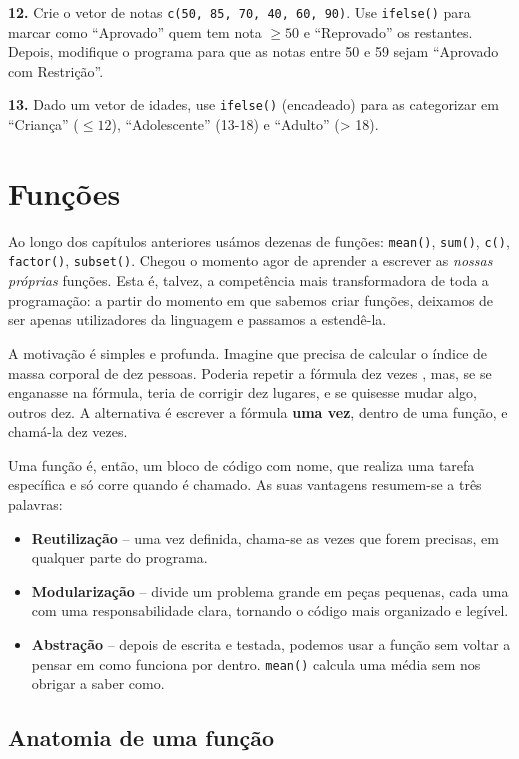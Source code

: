 \documentclass[
  portuguese,
  11pt,
  openany]{book}
\providecommand{\tightlist}{%
  \setlength{\itemsep}{0pt}\setlength{\parskip}{0pt}}
\begin{document}
\textbf{12.} Crie o vetor de notas \texttt{c(50,\ 85,\ 70,\ 40,\ 60,\ 90)}. Use \texttt{ifelse()} para
marcar como ``Aprovado'' quem tem nota \(\geq 50\) e ``Reprovado'' os restantes. Depois,
modifique o programa para que as notas entre 50 e 59 sejam ``Aprovado com
Restrição''.

\textbf{13.} Dado um vetor de idades, use \texttt{ifelse()} (encadeado) para as categorizar em
``Criança'' (\(\leq 12\)), ``Adolescente'' (13-18) e ``Adulto'' (\textgreater{} 18).

\chapter{Funções}\label{funcoes}

Ao longo dos capítulos anteriores usámos dezenas de funções: \texttt{mean()}, \texttt{sum()},
\texttt{c()}, \texttt{factor()}, \texttt{subset()}. Chegou o momento agor de aprender a
escrever as \emph{nossas próprias} funções. Esta é, talvez, a competência mais
transformadora de toda a programação: a partir do momento em que sabemos criar
funções, deixamos de ser apenas utilizadores da linguagem e passamos a
estendê-la.

A motivação é simples e profunda. Imagine que precisa de calcular o índice de
massa corporal de dez pessoas. Poderia repetir a fórmula dez vezes , mas, se se
enganasse na fórmula, teria de corrigir dez lugares, e se quisesse mudar algo,
outros dez. A alternativa é escrever a fórmula \textbf{uma vez}, dentro de uma função,
e chamá-la dez vezes.

Uma função é, então, um bloco de código com nome, que realiza uma tarefa
específica e só corre quando é chamado. As suas vantagens resumem-se a três
palavras:

\begin{itemize}
\tightlist
\item
  \textbf{Reutilização} -- uma vez definida, chama-se as vezes que forem precisas, em
  qualquer parte do programa.
\item
  \textbf{Modularização} -- divide um problema grande em peças pequenas, cada uma com
  uma responsabilidade clara, tornando o código mais organizado e legível.
\item
  \textbf{Abstração} -- depois de escrita e testada, podemos usar a função sem voltar a
  pensar em como funciona por dentro. \texttt{mean()} calcula uma média sem nos obrigar a
  saber como.
\end{itemize}

\section{Anatomia de uma função}\label{anatomia-de-uma-funuxe7uxe3o}
\end{document}
